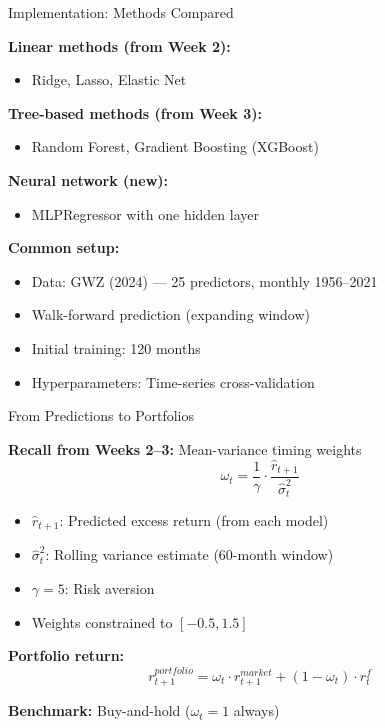 \documentclass[10pt]{beamer}
\begin{document}
\begin{frame}{Implementation: Methods Compared}

  \textbf{Linear methods (from Week 2):}
  \begin{itemize}
    \item Ridge, Lasso, Elastic Net
  \end{itemize}

  \vspace{0.3em}
  \textbf{Tree-based methods (from Week 3):}
  \begin{itemize}
    \item Random Forest, Gradient Boosting (XGBoost)
  \end{itemize}

  \vspace{0.3em}
  \textbf{Neural network (new):}
  \begin{itemize}
    \item MLPRegressor with one hidden layer
  \end{itemize}

  \vspace{1em}
  \textbf{Common setup:}
  \begin{itemize}
    \item Data: GWZ (2024) --- 25 predictors, monthly 1956--2021
    \item Walk-forward prediction (expanding window)
    \item Initial training: 120 months
    \item Hyperparameters: Time-series cross-validation
  \end{itemize}
\end{frame}


\begin{frame}{From Predictions to Portfolios}

  \textbf{Recall from Weeks 2--3:} Mean-variance timing weights
  \[
  \omega_t = \frac{1}{\gamma} \cdot \frac{\widehat{r}_{t+1}}{\widehat{\sigma}^2_t}
  \]

  \vspace{0.3em}
  \begin{itemize}
    \item $\widehat{r}_{t+1}$: Predicted excess return (from each model)
    \item $\widehat{\sigma}^2_t$: Rolling variance estimate (60-month window)
    \item $\gamma = 5$: Risk aversion
    \item Weights constrained to $[-0.5, 1.5]$
  \end{itemize}

  \vspace{1em}
  \textbf{Portfolio return:}
  \[
  r^{portfolio}_{t+1} = \omega_t \cdot r^{market}_{t+1} +(1-\omega_t)\cdot r_t^f
  \]

  \vspace{0.5em}
  \textbf{Benchmark:} Buy-and-hold ($\omega_t = 1$ always)
\end{frame}
\end{document}
